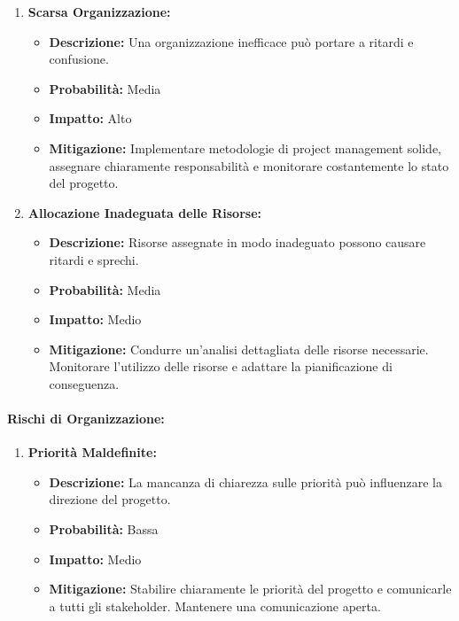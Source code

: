 \begin{enumerate}
    \item \textbf{Scarsa Organizzazione:}
          \begin{itemize}
              \item \textbf{Descrizione:} Una organizzazione inefficace può portare a ritardi e confusione.
              \item \textbf{Probabilità:} Media
              \item \textbf{Impatto:} Alto
              \item \textbf{Mitigazione:} Implementare metodologie di project management solide, assegnare chiaramente responsabilità e monitorare costantemente lo stato del progetto.
          \end{itemize}

    \item \textbf{Allocazione Inadeguata delle Risorse:}
          \begin{itemize}
              \item \textbf{Descrizione:} Risorse assegnate in modo inadeguato possono causare ritardi e sprechi.
              \item \textbf{Probabilità:} Media
              \item \textbf{Impatto:} Medio
              \item \textbf{Mitigazione:} Condurre un'analisi dettagliata delle risorse necessarie. Monitorare l'utilizzo delle risorse e adattare la pianificazione di conseguenza.
          \end{itemize}
\end{enumerate}

\paragraph{Rischi di Organizzazione:}

\begin{enumerate}
    \item \textbf{Priorità Maldefinite:}
          \begin{itemize}
              \item \textbf{Descrizione:} La mancanza di chiarezza sulle priorità può influenzare la direzione del progetto.
              \item \textbf{Probabilità:} Bassa
              \item \textbf{Impatto:} Medio
              \item \textbf{Mitigazione:} Stabilire chiaramente le priorità del progetto e comunicarle a tutti gli stakeholder. Mantenere una comunicazione aperta.
          \end{itemize}
\end{enumerate}

